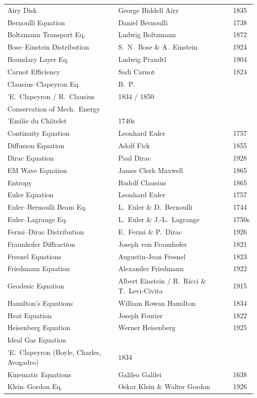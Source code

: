 \begin{longtable}{p{6cm}p{6cm}p{2.5cm}}
Airy Disk & George Biddell Airy & 1835 \\
Bernoulli Equation & Daniel Bernoulli & 1738 \\
Boltzmann Transport Eq. & Ludwig Boltzmann & 1872 \\
Bose--Einstein Distribution & S.\ N.\ Bose \& A.\ Einstein & 1924 \\
Boundary Layer Eq. & Ludwig Prandtl & 1904 \\
Carnot Efficiency & Sadi Carnot & 1824 \\
Clausius--Clapeyron Eq. & B.\ P.\ \\'E.\ Clapeyron / R.\ Clausius & 1834 / 1850 \\
Conservation of Mech.\ Energy & \\'Emilie du Ch\^atelet & 1740s \\
Continuity Equation & Leonhard Euler & 1757 \\
Diffusion Equation & Adolf Fick & 1855 \\
Dirac Equation & Paul Dirac & 1928 \\
EM Wave Equation & James Clerk Maxwell & 1865 \\
Entropy & Rudolf Clausius & 1865 \\
Euler Equation & Leonhard Euler & 1757 \\
Euler--Bernoulli Beam Eq. & L.\ Euler \& D.\ Bernoulli & 1744 \\
Euler--Lagrange Eq. & L.\ Euler \& J.-L.\ Lagrange & 1750s \\
Fermi--Dirac Distribution & E.\ Fermi \& P.\ Dirac & 1926 \\
Fraunhofer Diffraction & Joseph von Fraunhofer & 1821 \\
Fresnel Equations & Augustin-Jean Fresnel & 1823 \\
Friedmann Equation & Alexander Friedmann & 1922 \\
Geodesic Equation & Albert Einstein / R.\ Ricci \& T.\ Levi-Civita & 1915 \\
Hamilton's Equations & William Rowan Hamilton & 1834 \\
Heat Equation & Joseph Fourier & 1822 \\
Heisenberg Equation & Werner Heisenberg & 1925 \\
Ideal Gas Equation & \\'E.\ Clapeyron (Boyle, Charles, Avogadro) & 1834 \\
Kinematic Equations & Galileo Galilei & 1638 \\
Klein--Gordon Eq. & Oskar Klein \& Walter Gordon & 1926 \\

\end{longtable}
